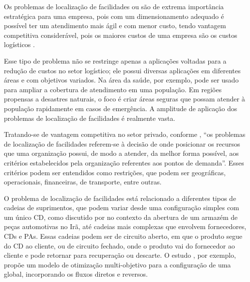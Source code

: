 \newcommand{\comando}[1]{\textbf{$\backslash$#1}}
 


Os problemas de localização de facilidades ou  são de extrema importância estratégica para uma empresa, pois com um dimensionamento adequado é possível ter um atendimento mais ágil e com menor custo, tendo vantagem competitiva considerável, pois os maiores custos de uma empresa são os custos logísticos \cite{Owen1998Strategic}.

Esse tipo de problema não se restringe apenas a aplicações voltadas para a redução de custos no setor logístico; ele possui diversas aplicações em diferentes áreas e com objetivos variados. Na área da saúde, por exemplo, pode ser usado para ampliar a cobertura de atendimento em uma população. Em regiões propensas a desastres naturais, o foco é criar áreas seguras que possam atender à população rapidamente em casos de emergência. A amplitude de aplicação dos problemas de localização de facilidades é realmente vasta. 

Tratando-se de vantagem competitiva no setor privado, conforme , “os problemas de localização de facilidades referem-se à decisão de onde posicionar os recursos que uma organização possui, de modo a atender, da melhor forma possível, aos critérios estabelecidos pela organização referentes aos pontos de demanda”. Esses critérios podem ser entendidos como restrições, que podem ser geográficas, operacionais, financeiras, de transporte, entre outras.

O problema de localização de facilidades está relacionado a diferentes tipos de cadeias de suprimentos, que podem variar desde uma configuração simples com um único CD, como discutido por  no contexto da abertura de um armazém de peças automotivas no Irã, até cadeias mais complexas que envolvem fornecedores, CDs e PAs. Essas cadeias podem ser de circuito aberto, em que o produto segue do CD ao cliente, ou de circuito fechado, onde o produto vai do fornecedor ao cliente e pode retornar para recuperação ou descarte. O estudo , por exemplo, propõe um modelo de otimização multi-objetivo para a configuração de uma  global, incorporando os fluxos diretos e reversos.

